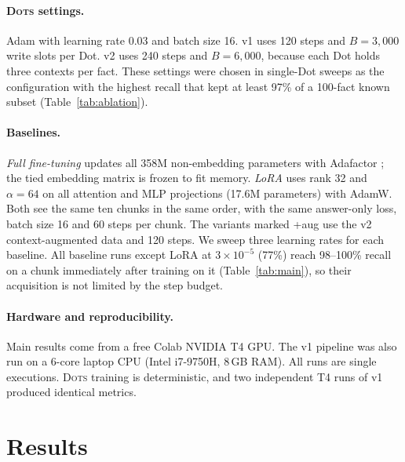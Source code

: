 \documentclass[11pt]{article}
\newcommand{\sys}{\textsc{Dots}}
\begin{document}
\paragraph{\sys{} settings.} Adam with learning rate 0.03 and batch size 16. v1 uses 120 steps and $B=3{,}000$ write slots per Dot. v2 uses 240 steps and $B=6{,}000$, because each Dot holds three contexts per fact. These settings were chosen in single-Dot sweeps as the configuration with the highest recall that kept at least 97\% of a 100-fact known subset (Table~\ref{tab:ablation}).

\paragraph{Baselines.} \emph{Full fine-tuning} updates all 358M non-embedding parameters with Adafactor \citep{shazeer2018adafactor}; the tied embedding matrix is frozen to fit memory. \emph{LoRA} \citep{hu2022lora} uses rank 32 and $\alpha=64$ on all attention and MLP projections (17.6M parameters) with AdamW. Both see the same ten chunks in the same order, with the same answer-only loss, batch size 16 and 60 steps per chunk. The variants marked +aug use the v2 context-augmented data and 120 steps. We sweep three learning rates for each baseline. All baseline runs except LoRA at $3\times10^{-5}$ (77\%) reach 98--100\% recall on a chunk immediately after training on it (Table~\ref{tab:main}), so their acquisition is not limited by the step budget.

\paragraph{Hardware and reproducibility.} Main results come from a free Colab NVIDIA T4 GPU. The v1 pipeline was also run on a 6-core laptop CPU (Intel i7-9750H, 8\,GB RAM). All runs are single executions. \sys{} training is deterministic, and two independent T4 runs of v1 produced identical metrics.

\section{Results}
\label{sec:results}
\end{document}
